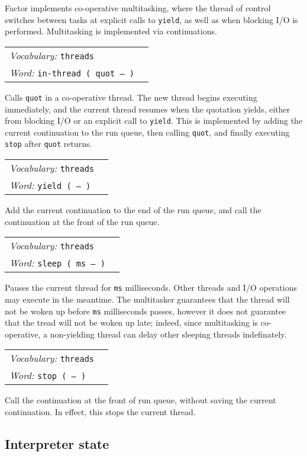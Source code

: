 \documentclass{book}
\newcommand{\vocabulary}[1]{\emph{Vocabulary:} \texttt{#1}&\\}
\newcommand{\ordinaryword}[2]{\index{\texttt{#1}}\emph{Word:} \texttt{#2}&\\}
\newcommand{\wordtable}[1]{


\begin{tabularx}{12cm}{lX}
\hline
#1
\hline
\end{tabularx}

}
\begin{document}
Factor implements co-operative multitasking, where the thread of control switches between tasks at explicit calls to \texttt{yield}, as well as when blocking I/O is performed. Multitasking is implemented via continuations.
\wordtable{
\vocabulary{threads}
\ordinaryword{in-thread}{in-thread ( quot -- )}

}
Calls \texttt{quot} in a co-operative thread. The new thread begins executing immediately, and the current thread resumes when the quotation yields, either from blocking
I/O or an explicit call to \texttt{yield}. This is implemented by adding the current continuation to the run queue, then calling \texttt{quot}, and finally executing \texttt{stop} after \texttt{quot} returns.
\wordtable{
\vocabulary{threads}
\ordinaryword{yield}{yield ( -- )}
}
Add the current continuation to the end of the run queue, and call the continuation at the front of the run queue.
\wordtable{
\vocabulary{threads}
\ordinaryword{sleep}{sleep ( ms -- )}
}
Pauses the current thread for \verb|ms| milliseconds. Other threads and I/O operations may execute in the meantime. The multitasker guarantees that the thread will not be woken up before \verb|ms| milliseconds passes, however it does not guarantee that the tread will not be woken up late; indeed, since multitasking is co-operative, a non-yielding thread can delay other sleeping threads indefinately.

\wordtable{
\vocabulary{threads}
\ordinaryword{stop}{stop ( -- )}

}
Call the continuation at the front of run queue, without saving the current continuation. In effect, this stops the current thread.

\subsection{Interpreter state}
\end{document}
